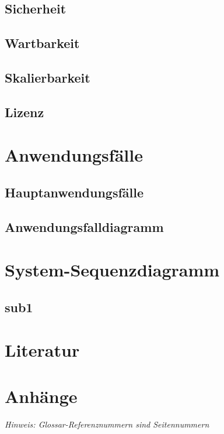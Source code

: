 \documentclass[11pt,ngerman]{article}
\begin{document}
        \subsection{Sicherheit}
        \subsection{Wartbarkeit}
        \subsection{Skalierbarkeit}
        \subsection{Lizenz}

    \section{Anwendungsfälle}

        \subsection{Hauptanwendungsfälle}

        \subsection{Anwendungsfalldiagramm}

    \section{System-Sequenzdiagramm}

        \subsection{sub1}


    \newpage

    \section{Literatur}
    \printbibliography[heading=none]

     \newpage

    \section{Anhänge}
    \textit{Hinweis: Glossar-Referenznummern sind Seitennummern}
    \printglossary
\end{document}
